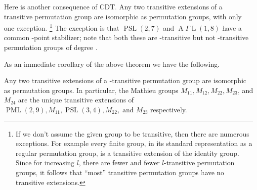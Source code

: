 %

Here is another consequence of CDT.
Any two transitive extensions of a transitive permutation 
group are
isomorphic as permutation groups, with only one exception. 
\footnote{If we don't assume the given group to be 
transitive,
then there are numerous exceptions. For example every 
finite group,
in its standard representation as a regular permutation 
group,
is a transitive extension of the identity group. Since for 
increasing $l$, 
there are fewer and fewer $l$-transitive permutation 
groups, it follows
that ``most'' transitive permutation groups have no 
transitive
extensions.}
The exception is that $\operatorname{PSL}(2,7)$ and 
$\operatorname{A}\Gamma\operatorname{L}(1,8)$ have a 
common
-point stabilizer\RM; note that both these are 
-transitive but
not -transitive permutation groups of degree . 
\endproclaim

As an immediate corollary of the above theorem we have the 
following.

Any two transitive extensions of a -transitive 
permutation group are
isomorphic as permutation groups. In particular, the Mathieu
groups $M_{11},M_{12},M_{22},M_{23}$, and $M_{24}$ are the 
unique 
transitive extensions of 
$\operatorname{PML}(2,9),M_{11},%
\operatorname{PSL}(3,4),M_{22},
\text{ and } M_{23}$ respectively.
\endproclaim

